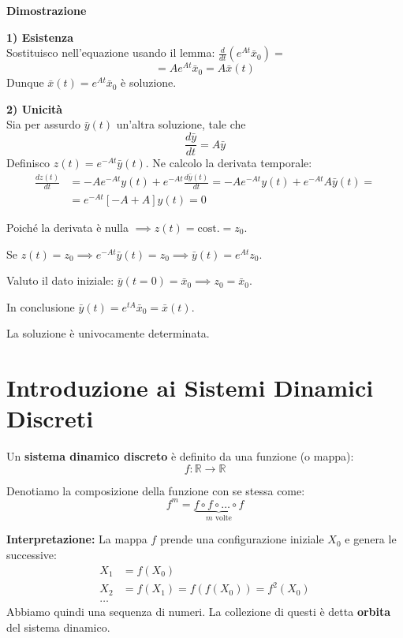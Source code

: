 \documentclass[openany]{book}
\theoremstyle{definition}
\theoremstyle{remark}
\begin{document}

\textbf{Dimostrazione}

\textbf{1) Esistenza} \\
Sostituisco nell'equazione usando il lemma: $\frac{d}{dt}(e^{At} \bar{x}_0) = $
\begin{equation*}
    = A e^{At} \bar{x}_0 = A \bar{x}(t)
\end{equation*}
Dunque $\bar{x}(t) = e^{At} \bar{x}_0$ è soluzione.

\vspace{0.5cm}
\textbf{2) Unicità} \\
Sia per assurdo $\bar{y}(t)$ un'altra soluzione, tale che 
\begin{equation*}
    \frac{d\bar{y}}{dt} = A\bar{y}
\end{equation*}
Definisco $z(t) = e^{-At} \bar{y}(t)$. Ne calcolo la derivata temporale:
\begin{align*}
    \frac{dz(t)}{dt} &= -A e^{-At} y(t) + e^{-At} \frac{d\bar{y}(t)}{dt} = -A e^{-At} y(t) + e^{-At} A \bar{y}(t) = \\
    &= e^{-At}[-A + A] y(t) = 0
\end{align*}

Poiché la derivata è nulla $\implies z(t) = \text{cost.} = z_0$.

Se $z(t) = z_0 \implies e^{-At} \bar{y}(t) = z_0 \implies \bar{y}(t) = e^{At} z_0$.

Valuto il dato iniziale: $\bar{y}(t=0) = \bar{x}_0 \implies z_0 = \bar{x}_0$.

In conclusione $\bar{y}(t) = e^{tA} \bar{x}_0 = \bar{x}(t)$. 

La soluzione è univocamente determinata.


\section{Introduzione ai Sistemi Dinamici Discreti}

Un \textbf{sistema dinamico discreto} è definito da una funzione (o mappa):
$$ f: \mathbb{R} \to \mathbb{R} $$

Denotiamo la composizione della funzione con se stessa come:
$$ f^m = \underbrace{f \circ f \circ \dots \circ f}_{m \text{ volte}} $$

\textbf{Interpretazione:}
La mappa $f$ prende una configurazione iniziale $X_0$ e genera le successive:
\begin{align*}
    X_1 &= f(X_0) \\
    X_2 &= f(X_1) = f(f(X_0)) = f^2(X_0) \\
    \dots
\end{align*}
Abbiamo quindi una sequenza di numeri. La collezione di questi è detta \textbf{orbita} del sistema dinamico.
\end{document}
